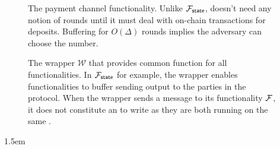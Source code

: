 \documentclass[11pt]{article}
\begin{document}
\begin{figure}
	
	\caption{The payment channel functionality. Unlike $\mathcal{F}_{{\mathsf {state}}}$, doesn't need any notion of rounds until it must deal with on-chain transactions for deposits. Buffering for $O(\Delta)$ rounds implies the adversary can choose the number.}
\end{figure}

\begin{figure}
	
	\caption{The wrapper $\mathcal{W}$ that provides common function for all functionalities. In $\mathcal{F}_{{\mathsf {state}}}$ for example, the wrapper enables functionalities to buffer sending output to the parties in the protocol. When the wrapper sends a message to its functionality $\mathcal{F}$, it does not constitute an  to  write as they are both running on the same .}
\end{figure}




\emergencystretch 1.5em

\end{document}
